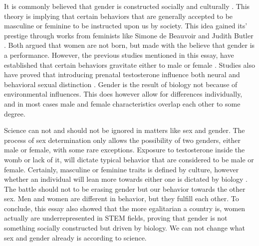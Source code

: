 \documentclass[12pt]{article}
\begin{document}
It is commonly believed that gender is constructed socially and culturally \cite{irshad2012gender}. This theory is implying that certain behaviors that are generally accepted to be masculine or feminine to be instructed upon us by society. This idea gained its' prestige through works from feminists like Simone de Beauvoir and Judith Butler \cite{endOfGender2020Soh}. Both argued that women are not born, but made with the believe that gender is a performance. However, the previous studies mentioned in this essay, have established that certain behaviors gravitate either to male or female \cite{menAndThings2009Sy}. Studies also have proved that introducing prenatal testosterone influence both neural and behavioral sexual distinction \cite{prenatalTestos}. Gender is the result of biology not because of environmental influences. This does however allow for differences individually, and in most cases male and female characteristics overlap each other to some degree. 
 
        Science can not and should not be ignored in matters like sex and gender. The process of sex determination only allows the possibility of two genders, either male or female, with some rare exceptions. Exposure to testosterone inside the womb or lack of it, will dictate typical behavior that are considered to be male or female. Certainly, masculine or feminine traits is defined by culture, however whether an individual will lean more towards either one is dictated by biology \cite{endOfGender2020Soh}. The battle should not to be erasing gender but our behavior towards the other sex. Men and women are different in behavior, but they fulfill each other. To conclude, this essay also showed that the more egalitarian a country is, women actually are underrepresented in STEM fields, proving that gender is not something socially constructed but driven by biology. We can not change what sex and gender already is according to science.



\end{document}
